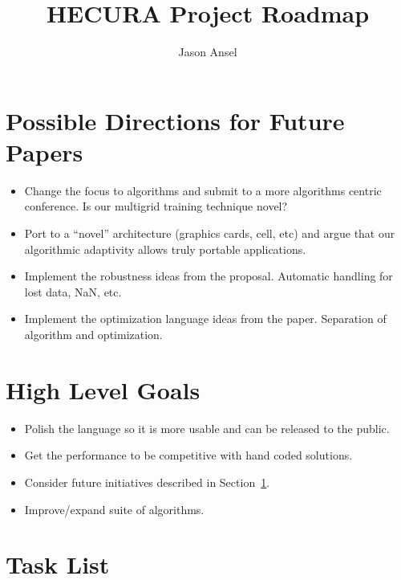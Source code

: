 \documentclass[11pt]{article}
\begin{document}
\title{HECURA Project Roadmap}
\author{Jason Ansel}
\maketitle
\tableofcontents


\section{Possible Directions for Future Papers}
\label{future}
\begin{itemize}

\item Change the focus to algorithms and submit to a more algorithms
    centric conference.  Is our multigrid training technique novel?

\item Port to a ``novel'' architecture (graphics cards, cell, etc)
    and argue that our algorithmic adaptivity allows truly portable
    applications.

\item Implement the robustness ideas from the proposal. Automatic handling
    for lost data, NaN, etc.

\item Implement the optimization language ideas from the paper.
    Separation of algorithm and optimization.

\end{itemize}

\section{High Level Goals}
\begin{itemize}

\item Polish the language so it is more usable and can be released to
the public.

\item Get the performance to be competitive with hand coded solutions.

\item Consider future initiatives described in Section~\ref{future}.

\item Improve/expand suite of algorithms.

\end{itemize}

\section{Task List}
\end{document}
